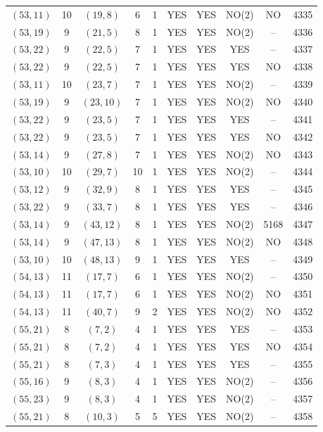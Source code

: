 \begin{longtable}{|c|c|c|c|c|c|c|c|c|c|}
$(53, 11)$ & 10 & $(19, 8)$ & 6 & 1 & YES & YES & NO(2) & NO & 4335\\
$(53, 19)$ & 9 & $(21, 5)$ & 8 & 1 & YES & YES & NO(2) & -- & 4336\\
$(53, 22)$ & 9 & $(22, 5)$ & 7 & 1 & YES & YES & YES & -- & 4337\\
$(53, 22)$ & 9 & $(22, 5)$ & 7 & 1 & YES & YES & YES & NO & 4338\\
$(53, 11)$ & 10 & $(23, 7)$ & 7 & 1 & YES & YES & NO(2) & -- & 4339\\
$(53, 19)$ & 9 & $(23, 10)$ & 7 & 1 & YES & YES & NO(2) & NO & 4340\\
$(53, 22)$ & 9 & $(23, 5)$ & 7 & 1 & YES & YES & YES & -- & 4341\\
$(53, 22)$ & 9 & $(23, 5)$ & 7 & 1 & YES & YES & YES & NO & 4342\\
$(53, 14)$ & 9 & $(27, 8)$ & 7 & 1 & YES & YES & NO(2) & NO & 4343\\
$(53, 10)$ & 10 & $(29, 7)$ & 10 & 1 & YES & YES & NO(2) & -- & 4344\\
$(53, 12)$ & 9 & $(32, 9)$ & 8 & 1 & YES & YES & YES & -- & 4345\\
$(53, 22)$ & 9 & $(33, 7)$ & 8 & 1 & YES & YES & YES & -- & 4346\\
$(53, 14)$ & 9 & $(43, 12)$ & 8 & 1 & YES & YES & NO(2) & 5168 & 4347\\
$(53, 14)$ & 9 & $(47, 13)$ & 8 & 1 & YES & YES & NO(2) & NO & 4348\\
$(53, 10)$ & 10 & $(48, 13)$ & 9 & 1 & YES & YES & YES & -- & 4349\\
$(54, 13)$ & 11 & $(17, 7)$ & 6 & 1 & YES & YES & NO(2) & -- & 4350\\
$(54, 13)$ & 11 & $(17, 7)$ & 6 & 1 & YES & YES & NO(2) & NO & 4351\\
$(54, 13)$ & 11 & $(40, 7)$ & 9 & 2 & YES & YES & NO(2) & NO & 4352\\
$(55, 21)$ & 8 & $(7, 2)$ & 4 & 1 & YES & YES & YES & -- & 4353\\
$(55, 21)$ & 8 & $(7, 2)$ & 4 & 1 & YES & YES & YES & NO & 4354\\
$(55, 21)$ & 8 & $(7, 3)$ & 4 & 1 & YES & YES & YES & -- & 4355\\
$(55, 16)$ & 9 & $(8, 3)$ & 4 & 1 & YES & YES & NO(2) & -- & 4356\\
$(55, 23)$ & 9 & $(8, 3)$ & 4 & 1 & YES & YES & NO(2) & -- & 4357\\
$(55, 21)$ & 8 & $(10, 3)$ & 5 & 5 & YES & YES & NO(2) & -- & 4358\\

\end{longtable}

